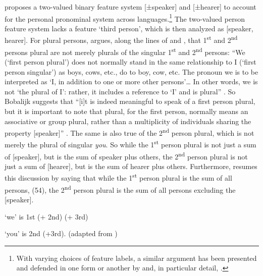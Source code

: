 \documentclass[output=paper]{langsci/langscibook}
\begin{document}
\citet{Bobaljik2008Missing} proposes a two-valued binary feature system [±speaker] and [±hearer] to account for the personal pronominal system across languages.\footnote{With varying choices of feature labels, a similar argument has been presented and defended in one form or another by \citet{Ingram1978,Harley2002Person} and, in particular detail, \citet[Chapter~2]{Noyer1997}.} The two-valued person feature system lacks a feature ‘third person’, which is then analyzed as [\textminus{}speaker, \textminus{}hearer]. For plural persons, \citet{Bobaljik2008Missing} argues, along the lines of \citet{Lyons1968} and \citet{Benveniste1966}, that 1\textsuperscript{st} and 2\textsuperscript{nd} persons plural are not merely plurals of the singular 1\textsuperscript{st} and 2\textsuperscript{nd} persons: “We (‘first person plural’) does not normally stand in the same relationship to I (‘first person singular’) as boys, cows, etc., do to boy, cow, etc. The pronoun we is to be interpreted as ‘I, in addition to one or more other persons’… In other words, we is not ‘the plural of I’: rather, it includes a reference to ‘I’ and is plural” \citet[277]{Lyons1968}. So Bobalijk suggests that “[i]t is indeed meaningful to speak of a first person plural, but it is important to note that plural, for the first person, normally means an associative or group plural, rather than a multiplicity of individuals sharing the property [speaker]” \citep[209]{Bobaljik2008Missing}. The same is also true of the 2\textsuperscript{nd} person plural, which is not merely the plural of singular \textit{you}. So while the 1\textsuperscript{st} person plural is not just a sum of [speaker], but is the sum of speaker plus others, the 2\textsuperscript{nd} person plural is not just a sum of [hearer], but is the sum of hearer plus others. Furthermore, \citet{Bobaljik2008Missing} resumes this discussion by saying that while the 1\textsuperscript{st} person plural is the sum of all persons, (54), the 2\textsuperscript{nd} person plural is the sum of all persons excluding the [speaker].

\ea%
    \label{ex:lorusso:54}
    ‘we’ is 1st (+ 2nd) (+ 3rd) 
\z

          

\ea%
    \label{ex:lorusso:55}
    ‘you’ is 2nd (+3rd). (adapted from \citealt{Bobaljik2008Missing}) 
\z

          
\end{document}
